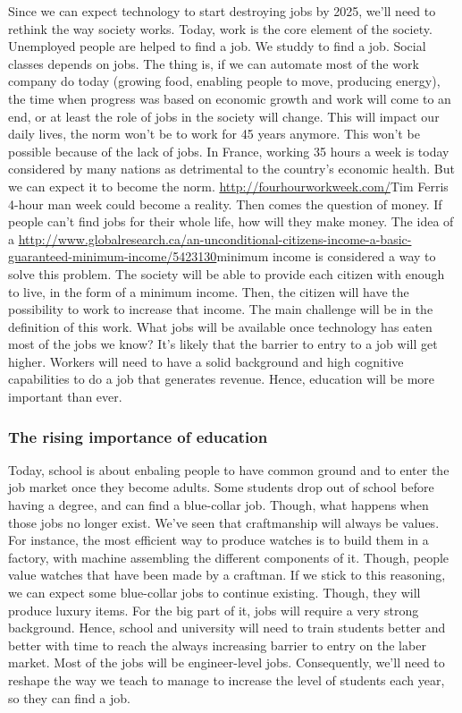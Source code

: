 \documentclass[12pt]{article}
\begin{document}
Since we can expect technology to start destroying jobs by 2025, we'll need to rethink the way society works. Today, work is the core element of the society. Unemployed people are helped to find a job. We studdy to find a job. Social classes depends on jobs.
The thing is, if we can automate most of the work company do today (growing food, enabling people to move, producing energy), the time when progress was based on economic growth and work will come to an end, or at least the role of jobs in the society will change.
This will impact our daily lives, the norm won't be to work for 45 years anymore. This won't be possible because of the lack of jobs. In France, working 35 hours a week is today considered by many nations as detrimental to the country's economic health. But we can expect it to become the norm. \url{http://fourhourworkweek.com/}{Tim Ferris 4-hour man week} could become a reality.
Then comes the question of money. If people can't find jobs for their whole life, how will they make money. The idea of a \url{http://www.globalresearch.ca/an-unconditional-citizens-income-a-basic-guaranteed-minimum-income/5423130}{minimum income} is considered a way to solve this problem. The society will be able to provide each citizen with enough to live, in the form of a minimum income. Then, the citizen will have the possibility to work to increase that income.
The main challenge will be in the definition of this work. What jobs will be available once technology has eaten most of the jobs we know? It's likely that the barrier to entry to a job will get higher. Workers will need to have a solid background and high cognitive capabilities to do a job that generates revenue. Hence, education will be more important than ever.

\subsubsection{The rising importance of education}

Today, school is about enbaling people to have common ground and to enter the job market once they become adults. Some students drop out of school before having a degree, and can find a blue-collar job. Though, what happens when those jobs no longer exist.
We've seen that craftmanship will always be values. For instance, the most efficient way to produce watches is to build them in a factory, with machine assembling the different components of it. Though, people value watches that have been made by a craftman. If we stick to this reasoning, we can expect some blue-collar jobs to continue existing. Though, they will produce luxury items.
For the big part of it, jobs will require a very strong background. Hence, school and university will need to train students better and better with time to reach the always increasing barrier to entry on the laber market. Most of the jobs will be engineer-level jobs.
Consequently, we'll need to reshape the way we teach to manage to increase the level of students each year, so they can find a job.
\end{document}
